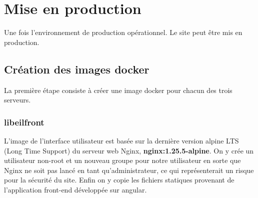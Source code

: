 


\section{Mise en production}
Une fois l'environnement de production op\'erationnel. Le site peut \^etre mis en production.

\subsection{Cr\'eation des images docker}
La premi\`ere \'etape consiste \`a cr\'eer une image docker pour chacun des trois serveurs.

\subsubsection{libeilfront}
L'image de l'interface utilisateur est bas\'ee sur la derni\`ere version alpine LTS (Long Time Support) du serveur web Nginx, \textbf{nginx:1.25.5-alpine}. On y cr\'ee un utilisateur non-root et un nouveau groupe pour notre utilisateur en sorte que Nginx ne soit pas lanc\'e en tant qu'administrateur, ce qui repr\'esenterait un risque pour la s\'ecurit\'e du site. Enfin on y copie les fichiers statiques provenant de l'application front-end d\'evelopp\'ee sur angular.

